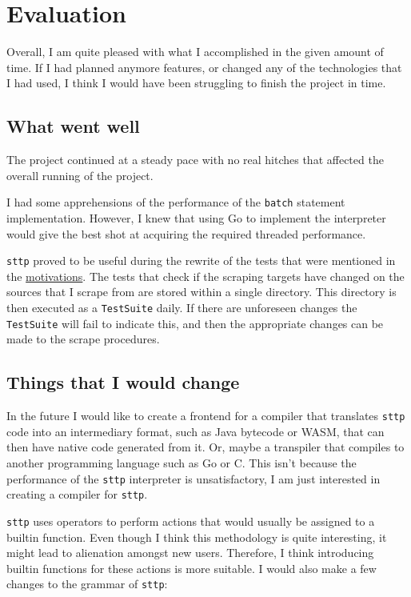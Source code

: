 \chapter{Evaluation}
\label{chap:evaluation}

Overall, I am quite pleased with what I accomplished in the given amount of time. If I had planned anymore features, or changed any of the technologies that I had used, I think I would have been struggling to finish the project in time.

\section{What went well}

The project continued at a steady pace with no real hitches that affected the overall running of the project.

I had some apprehensions of the performance of the \verb|batch| statement implementation. However, I knew that using Go to implement the interpreter would give the best shot at acquiring the required threaded performance.

\verb|sttp| proved to be useful during the rewrite of the tests that were mentioned in the \hyperref[chap:motivations]{motivations}. The tests that check if the scraping targets have changed on the sources that I scrape from are stored within a single directory. This directory is then executed as a \verb|TestSuite| daily. If there are unforeseen changes the \verb|TestSuite| will fail to indicate this, and then the appropriate changes can be made to the scrape procedures.

\section{Things that I would change}

In the future I would like to create a frontend for a compiler that translates \verb|sttp| code into an intermediary format, such as Java bytecode or WASM, that can then have native code generated from it. Or, maybe a transpiler that compiles to another programming language such as Go or C. This isn't because the performance of the \verb|sttp| interpreter is unsatisfactory, I am just interested in creating a compiler for \verb|sttp|.

\verb|sttp| uses operators to perform actions that would usually be assigned to a builtin function. Even though I think this methodology is quite interesting, it might lead to alienation amongst new users. Therefore, I think introducing builtin functions for these actions is more suitable. I would also make a few changes to the grammar of \verb|sttp|:

